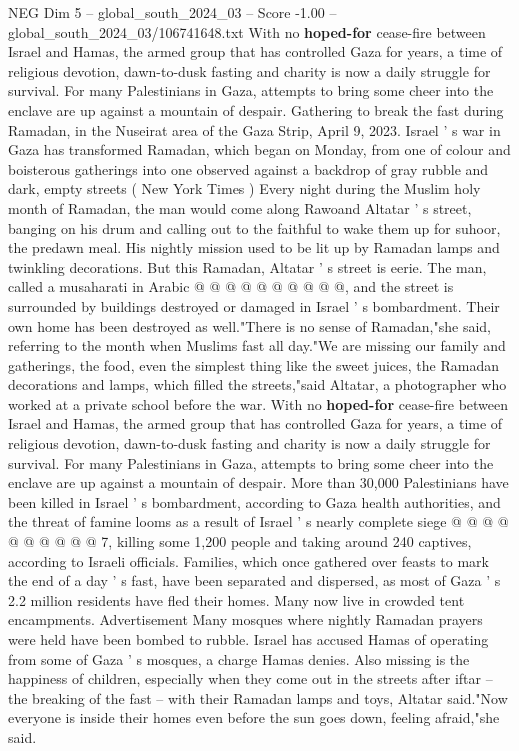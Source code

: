 \begin{textsample}{NEG Dim 5 – global\_south\_2024\_03 – Score -1.00 – global\_south\_2024\_03/106741648.txt}  \label{ex:f5_neg_312}
With no \textbf{hoped-for} cease-fire between Israel and Hamas, the armed group that has controlled Gaza for years, a time of religious devotion, dawn-to-dusk fasting and charity is now a daily struggle for survival.
For many Palestinians in Gaza, attempts to bring some cheer into the enclave are up against a mountain of despair.
Gathering to break the fast during Ramadan, in the Nuseirat area of the Gaza Strip, April 9, 2023.
Israel ' s war in Gaza has transformed Ramadan, which began on Monday, from one of colour and boisterous gatherings into one observed against a backdrop of gray rubble and dark, empty streets ( New York Times ) Every night during the Muslim holy month of Ramadan, the man would come along Rawoand Altatar ' s street, banging on his drum and calling out to the faithful to wake them up for suhoor, the predawn meal.
His nightly mission used to be lit up by Ramadan lamps and twinkling decorations.
But this Ramadan, Altatar ' s street is eerie.
The man, called a musaharati in Arabic @ @ @ @ @ @ @ @ @ @, and the street is surrounded by buildings destroyed or damaged in Israel ' s bombardment.
Their own home has been destroyed as well."There is no sense of Ramadan,"she said, referring to the month when Muslims fast all day."We are missing our family and gatherings, the food, even the simplest thing like the sweet juices, the Ramadan decorations and lamps, which filled the streets,"said Altatar, a photographer who worked at a private school before the war.
With no \textbf{hoped-for} cease-fire between Israel and Hamas, the armed group that has controlled Gaza for years, a time of religious devotion, dawn-to-dusk fasting and charity is now a daily struggle for survival.
For many Palestinians in Gaza, attempts to bring some cheer into the enclave are up against a mountain of despair.
More than 30,000 Palestinians have been killed in Israel ' s bombardment, according to Gaza health authorities, and the threat of famine looms as a result of Israel ' s nearly complete siege @ @ @ @ @ @ @ @ @ @ 7, killing some 1,200 people and taking around 240 captives, according to Israeli officials.
Families, which once gathered over feasts to mark the end of a day ' s fast, have been separated and dispersed, as most of Gaza ' s 2.2 million residents have fled their homes.
Many now live in crowded tent encampments.
Advertisement Many mosques where nightly Ramadan prayers were held have been bombed to rubble.
Israel has accused Hamas of operating from some of Gaza ' s mosques, a charge Hamas denies.
Also missing is the happiness of children, especially when they come out in the streets after iftar -- the breaking of the fast -- with their Ramadan lamps and toys, Altatar said."Now everyone is inside their homes even before the sun goes down, feeling afraid,"she said.

\end{textsample}
